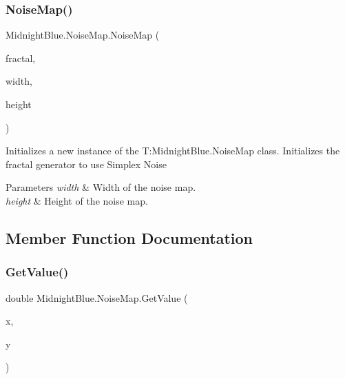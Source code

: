 \subsubsection{\texorpdfstring{Noise\+Map()}{NoiseMap()}\hspace{0.1cm}{\footnotesize\ttfamily [2/2]}}
{\footnotesize\ttfamily Midnight\+Blue.\+Noise\+Map.\+Noise\+Map (\begin{DoxyParamCaption}\item[{Implicit\+Module\+Base}]{fractal,  }\item[{int}]{width,  }\item[{int}]{height }\end{DoxyParamCaption})\hspace{0.3cm}{\ttfamily [inline]}}



Initializes a new instance of the T\+:\+Midnight\+Blue.\+Noise\+Map class. Initializes the fractal generator to use Simplex Noise 


\begin{DoxyParams}{Parameters}
{\em width} & Width of the noise map.\\
\hline
{\em height} & Height of the noise map.\\
\hline
\end{DoxyParams}


\subsection{Member Function Documentation}
\hypertarget{class_midnight_blue_1_1_noise_map_a70d9e8d99e157143eb3d1dbc3895cb9a}{}\label{class_midnight_blue_1_1_noise_map_a70d9e8d99e157143eb3d1dbc3895cb9a} 
\subsubsection{\texorpdfstring{Get\+Value()}{GetValue()}}
{\footnotesize\ttfamily double Midnight\+Blue.\+Noise\+Map.\+Get\+Value (\begin{DoxyParamCaption}\item[{int}]{x,  }\item[{int}]{y }\end{DoxyParamCaption})\hspace{0.3cm}{\ttfamily [inline]}}




